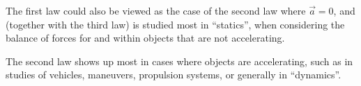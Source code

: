 \documentclass[handout]{tufte-handout}
\begin{document}
The first law could also be viewed as the case of the second law where $\vec{a}=0$, and (together with the third law) is studied most in ``statics'', when considering the balance of forces for and within objects that are not accelerating. 

The second law shows up most in cases where objects are accelerating, such as in studies of vehicles, maneuvers, propulsion systems, or generally in ``dynamics''. 
\end{document}
